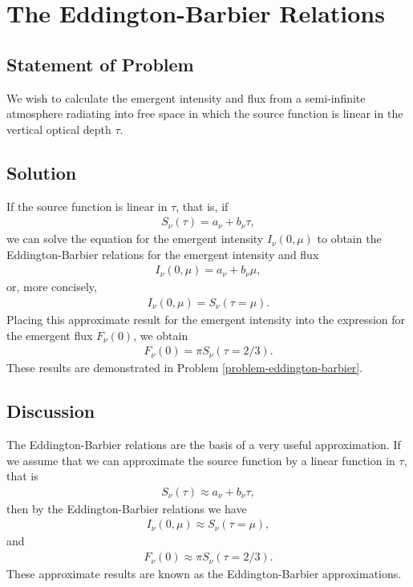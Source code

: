 \newslide

\section{The Eddington-Barbier Relations}

\subsection{Statement of Problem}

We wish to calculate the emergent intensity and flux from a semi-infinite atmosphere radiating into free space in which the source function is linear in the vertical optical depth $\tau$.

\subsection{Solution}

If the source function is linear in $\tau$, that is,
if
\begin{align}
S_\nu(\tau) = a_\nu + b_\nu \tau,
\end{align}
we can solve the equation for the emergent intensity
$I_\nu(0,\mu)$ to obtain the Eddington-Barbier relations for
the emergent intensity and flux
\begin{align}
I_\nu(0,\mu) = a_\nu + b_\nu \mu,
\end{align}
or, more concisely,
\begin{align}
I_\nu(0,\mu) = S_\nu(\tau = \mu).
\end{align}
Placing this approximate result for the emergent intensity
into the expression for the emergent flux $F_\nu(0)$, we
obtain
\begin{align}
F_\nu(0) = \pi S_\nu(\tau = 2/3).
\end{align}
These results are demonstrated in Problem
\ref{problem-eddington-barbier}.

\newslide

\subsection{Discussion}

The Eddington-Barbier relations are the basis of a very
useful approximation. If we assume that we can approximate
the source function by a linear function in $\tau$, that
is
\begin{align}
S_\nu(\tau) \approx a_\nu + b_\nu \tau,
\end{align}
then by the Eddington-Barbier relations we have
\begin{align}
I_\nu(0,\mu) \approx S_\nu(\tau = \mu),
\end{align}
and
\begin{align}
F_\nu(0) \approx \pi S_\nu(\tau = 2/3).
\end{align}
These approximate results are known as the Eddington-Barbier
approximations.

